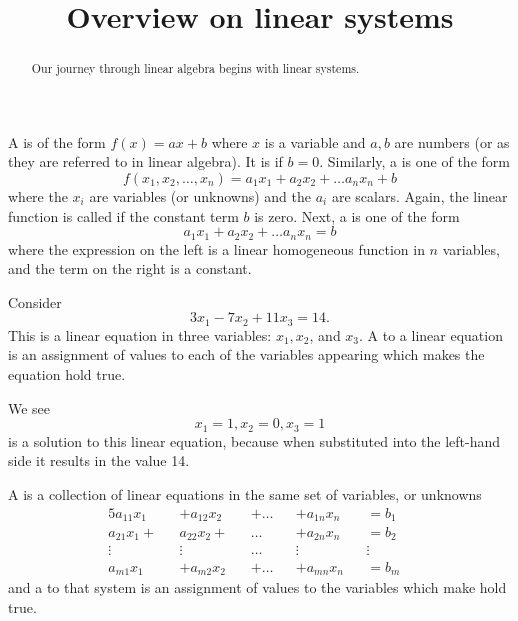 \documentclass{ximera}
\title{Overview on linear systems}
\begin{document}
\begin{abstract}
  Our journey through linear algebra begins with linear systems.
\end{abstract}

\maketitle


\begin{definition}
  A  is of the form $f(x) = ax+b$ where $x$ is a variable and $a,b$ are numbers (or  as they are referred to in linear algebra). It is  if $b=0$. Similarly, a  is one of the form
  \[
    f(x_1,x_2,\dots,x_n) = a_1x_1 + a_2x_2 + \dots a_nx_n + b
  \]
  where the $x_i$ are variables (or unknowns) and the $a_i$ are scalars. Again, the linear function is called  if the constant term $b$ is zero. Next, a  is one of the form
  \[
    a_1x_1 + a_2x_2 + \dots a_nx_n =  b
  \]
  where the expression on the left is a linear homogeneous function in $n$ variables, and the term on the right is a constant.
\end{definition}

\begin{example}
  Consider
  \begin{equation}
    3x_1 - 7x_2 + 11x_3 = 14.
  \end{equation}
  This is a linear equation in three variables: $x_1, x_2$, and
  $x_3$. A  to a linear equation is an assignment of
  values to each of the variables appearing which makes the equation
  hold true.

  We see
  \[
    x_1 = 1, x_2 = 0, x_3 = 1
  \]
  is a solution to this linear equation, because when substituted into the left-hand side it results in the value 14.
\end{example}

\begin{definition}
  A  is a collection of linear equations in the same set of variables, or unknowns
  \begin{alignat*}{5}\tag{2.2}\label{eqn:sys}
    a_{11}x_1 &&+ a_{12}x_2 && + {}\ldots{} && + a_{1n}x_n && =  b_1 &\\
    a_{21}x_1 + && a_{22}x_2 + &&  {}\ldots{} && + a_{2n}x_n &&  = b_2 &\\
    \vdots &&  \vdots &&  {}\ldots{} &&  \vdots &&   \vdots &\\
    a_{m1}x_1 &&+ a_{m2}x_2 && + {}\ldots{} && + a_{mn}x_n && =  b_m &
  \end{alignat*}
  and a  to that system is an assignment of values to the variables which make  hold true.
\end{definition}
\end{document}
